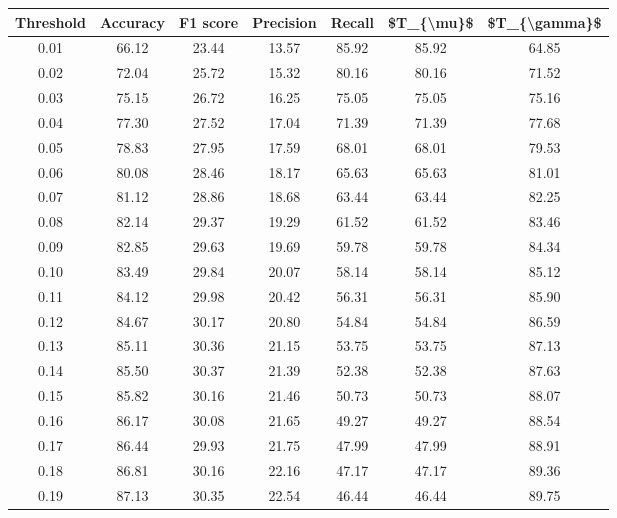 \begin{tabular}{|c|c|c|c|c|c|c|}
\hline
 Threshold &  Accuracy &  F1 score &  Precision &  Recall &  \$T\_\{\textbackslash mu\}\$ &  \$T\_\{\textbackslash gamma\}\$ \\
\hline
      0.01 &     66.12 &     23.44 &      13.57 &   85.92 &      85.92 &         64.85 \\
      0.02 &     72.04 &     25.72 &      15.32 &   80.16 &      80.16 &         71.52 \\
      0.03 &     75.15 &     26.72 &      16.25 &   75.05 &      75.05 &         75.16 \\
      0.04 &     77.30 &     27.52 &      17.04 &   71.39 &      71.39 &         77.68 \\
      0.05 &     78.83 &     27.95 &      17.59 &   68.01 &      68.01 &         79.53 \\
      0.06 &     80.08 &     28.46 &      18.17 &   65.63 &      65.63 &         81.01 \\
      0.07 &     81.12 &     28.86 &      18.68 &   63.44 &      63.44 &         82.25 \\
      0.08 &     82.14 &     29.37 &      19.29 &   61.52 &      61.52 &         83.46 \\
      0.09 &     82.85 &     29.63 &      19.69 &   59.78 &      59.78 &         84.34 \\
      0.10 &     83.49 &     29.84 &      20.07 &   58.14 &      58.14 &         85.12 \\
      0.11 &     84.12 &     29.98 &      20.42 &   56.31 &      56.31 &         85.90 \\
      0.12 &     84.67 &     30.17 &      20.80 &   54.84 &      54.84 &         86.59 \\
      0.13 &     85.11 &     30.36 &      21.15 &   53.75 &      53.75 &         87.13 \\
      0.14 &     85.50 &     30.37 &      21.39 &   52.38 &      52.38 &         87.63 \\
      0.15 &     85.82 &     30.16 &      21.46 &   50.73 &      50.73 &         88.07 \\
      0.16 &     86.17 &     30.08 &      21.65 &   49.27 &      49.27 &         88.54 \\
      0.17 &     86.44 &     29.93 &      21.75 &   47.99 &      47.99 &         88.91 \\
      0.18 &     86.81 &     30.16 &      22.16 &   47.17 &      47.17 &         89.36 \\
      0.19 &     87.13 &     30.35 &      22.54 &   46.44 &      46.44 &         89.75 \\

\end{tabular}
